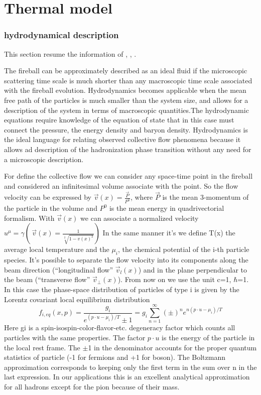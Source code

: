 \documentclass[12pt,a4paper]{book}
\begin{document}
	
	\chapter{Thermal model}
	\subsection{hydrodynamical description}
	This section resume the information of \cite{heinz2004conceptsheavyionphysics}, \cite{phdthesis}, \cite{Cooper-Frye}.
	
	The fireball can be approximately described as an ideal fluid if the microscopic scattering time scale is much shorter than any macroscopic time scale associated with the fireball evolution. 	Hydrodynamics becomes applicable when the mean free path of the particles is much smaller than the system size, and allows for a description of the system in terms of	macroscopic quantities.The hydrodynamic equations require knowledge of the equation of state that in this case must connect the pressure, the energy density and baryon density. Hydrodynamics is the ideal language for relating observed collective flow phenomena because it allows ad description of the hadronization phase transition without any need for a microscopic description. 
	
	For define the collective flow we can consider any space-time point in the fireball and considered an infinitesimal volume associate with the point. So the flow velocity can be expressed by $\vec{v}(x) =\frac{\vec{P}}{P^0}$, where $\vec{P}$ is the mean 3-momentum of the particle in the volume and $P^0$ is the mean energy in quadrivectorial formalism. With $\vec{v}(x)$ we can associate a normalized velocity $u^\mu=\gamma(\,\vec{v}(x)= \frac{1}{\sqrt[2]{1-v(x)^2}})$ In the same manner it's we define T(x) the average local temperature and the $\mu_i$, the chemical potential of the i-th particle species.  It's possible to separate the flow velocity into its components along the beam direction (“longitudinal flow” $\vec{v}_l(x)$) and in the plane perpendicular to the beam (“transverse flow” $\vec{v}_\perp(x)$). From now on we use the unit c=1, $\hbar$=1. In this case the phase-space distribution of particles of type i is given by the Lorentz covariant local equilibrium distribution
	\begin{equation}
		f_{i,eq}(x,p)=\frac{g_i}{e^{(p \cdot u - \mu_i)/T} \pm 1} = g_i \sum_{n=1}^{\infty} (\pm)^{n} e^{n(p \cdot u - \mu_i)/T}
		\label{eq:boltzmann}
	\end{equation}
	Here gi is a spin-isospin-color-flavor-etc. degeneracy factor which counts all particles with the same properties. The factor $p \cdot u$ is the energy of the particle in the local rest frame. The $\pm$1 in the denominator accounts for the proper quantum statistics of particle (-1 for fermions and +1 for boson). The Boltzmann approximation corresponds to keeping only the first term in the sum over n in the last expression. In our applications this is an excellent analytical approximation for all hadrons except for the pion because of their mass.
	
\end{document}
